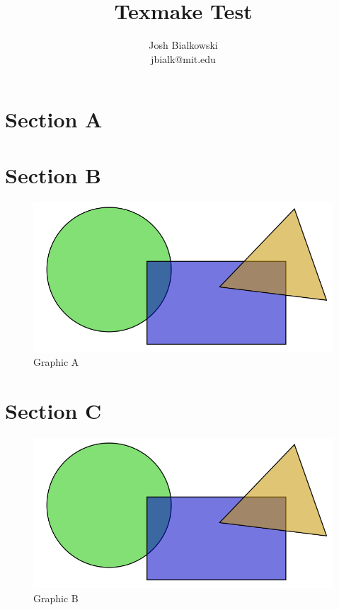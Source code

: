 \documentclass[10pt,oneside]{article}
\title{Texmake Test}
\author{Josh Bialkowski \\ \small jbialk@mit.edu}
\begin{document}
\maketitle
\section{Section A}

\section{Section B}

\begin{figure}[h]
\begin{centering}
    \includegraphics[scale=1]{fig/a}
    \caption{Graphic A}
\end{centering}
\end{figure}

\section{Section C}

\begin{figure}[h]
\begin{centering}
    \includegraphics[scale=1]{fig/b/b}
    \caption{Graphic B}
\end{centering}
\end{figure}



\end{document}
